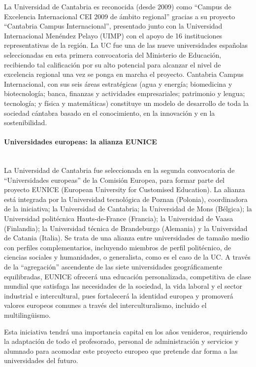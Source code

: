 La Universidad de Cantabria es reconocida (desde 2009) como ``Campus de Excelencia Internacional CEI 2009 de ámbito regional'' gracias a su proyecto ``Cantabria Campus Internacional'', presentado junto con la Universidad Internacional Menéndez Pelayo (UIMP) con el apoyo de 16 instituciones representativas de la región. La UC fue una de las nueve universidades españolas seleccionadas en esta primera convocatoria del Ministerio de Educación, recibiendo tal calificación por su alto potencial para alcanzar el nivel de excelencia regional una vez se ponga en marcha el proyecto. Cantabria Campus Internacional, con sus seis áreas estratégicas (agua y energía; biomedicina y biotecnología; banca, finanzas y actividades empresariales; patrimonio y lengua; tecnología; y física y matemáticas) constituye un modelo de desarrollo de toda la sociedad cántabra basado en el conocimiento, en la innovación y en la sostenibilidad. 


\paragraph{Universidades europeas: la alianza EUNICE\\\\}

La Universidad de Cantabria fue seleccionada en la segunda convocatoria de ``Universidades europeas'' de la Comisión Europea, para formar parte del proyecto EUNICE (European University for Customised Education). La alianza está integrada por la Universidad tecnológica de Poznan (Polonia), coordinadora de la iniciativa; la Universidad de Cantabria; la Universidad de Mons (Bélgica); la Universidad politécnica Hauts-de-France (Francia); la Universidad de Vaasa (Finlandia); la Universidad técnica de Brandeburgo (Alemania) y la Universidad de Catania (Italia). Se trata de una alianza entre universidades de tamaño medio con perfiles complementarios, incluyendo miembros de perfil politécnico, de ciencias sociales y humanidades, o generalista, como es el caso de la UC. A través de la ``agregación'' ascendente de las siete universidades geográficamente equilibradas, EUNICE ofrecerá una educación personalizada, competitiva de clase mundial que satisfaga las necesidades de la sociedad, la vida laboral y el sector industrial e intercultural, pues fortalecerá la identidad europea y promoverá valores europeos comunes a través del interculturalismo, incluido el multilingüismo.

Esta iniciativa tendrá una importancia capital en los años venideros, requiriendo la adaptación de todo el profesorado, personal de administración y servicios y alumnado para acomodar este proyecto europeo que pretende dar forma a las universidades del futuro. 



